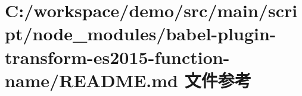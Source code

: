 \hypertarget{node__modules_2babel-plugin-transform-es2015-function-name_2_r_e_a_d_m_e_8md}{}\section{C\+:/workspace/demo/src/main/script/node\+\_\+modules/babel-\/plugin-\/transform-\/es2015-\/function-\/name/\+R\+E\+A\+D\+ME.md 文件参考}
\label{node__modules_2babel-plugin-transform-es2015-function-name_2_r_e_a_d_m_e_8md}
